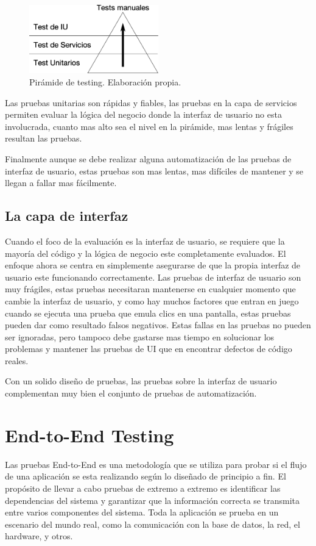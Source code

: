 \begin{figure}
\centering
\includegraphics[width=0.5\textwidth]{graphics/pyramid.eps}
\caption{Pirámide de testing. Elaboración propia.}
\label{piramide}
\end{figure}

Las pruebas unitarias son rápidas y fiables, las pruebas en la capa de servicios
permiten evaluar la lógica del negocio donde la interfaz de usuario no esta
involucrada, cuanto mas alto sea el nivel en la pirámide, mas lentas y frágiles
resultan las pruebas.

Finalmente aunque se debe realizar alguna automatización de las pruebas de
interfaz de usuario, estas pruebas son mas lentas, mas difíciles de mantener y
se llegan a fallar mas fácilmente.

\subsection{La capa de interfaz}
Cuando el foco de la evaluación es la interfaz de usuario, se requiere que la
mayoría del código y la lógica de negocio este completamente evaluados. El
enfoque ahora se centra en simplemente asegurarse de que la propia interfaz de
usuario este funcionando correctamente. Las pruebas de interfaz de usuario son
muy frágiles, estas pruebas necesitaran mantenerse en cualquier momento que
cambie la interfaz de usuario, y como hay muchos factores que entran en juego
cuando se ejecuta una prueba que emula clics en una pantalla, estas pruebas
pueden dar como resultado falsos negativos. Estas fallas en las pruebas no
pueden ser ignoradas, pero tampoco debe gastarse mas tiempo en solucionar los
problemas y mantener las pruebas de UI que en encontrar defectos de código
reales.

Con un solido diseño de pruebas, las pruebas sobre la interfaz de usuario
complementan muy bien el conjunto de pruebas de automatización.

\section{End-to-End Testing}
Las pruebas End-to-End es una metodología que se utiliza para probar si el flujo
de una aplicación se esta realizando según lo diseñado de principio a fin. El
propósito de llevar a cabo pruebas de extremo a extremo es identificar las
dependencias del sistema y garantizar que la información correcta se transmita
entre varios componentes del sistema. Toda la aplicación se prueba en un
escenario del mundo real, como la comunicación con la base de datos, la red, el
hardware, y otros.

